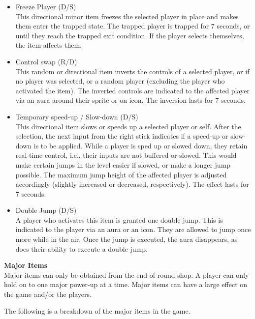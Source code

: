 \begin{itemize}
    \item Freeze Player (D/S)\\
This directional minor item freezes the selected player in place and makes them enter the trapped state. The trapped player is trapped for 7 seconds, or until they reach the trapped exit condition. If the player selects themselves, the item affects them.
    \item Control swap (R/D)\\
This random or directional item inverts the controls of a selected player, or if no player was selected, or a random player (excluding the player who activated the item). The inverted controls are indicated to the affected player via an aura around their sprite or on icon. The inversion lasts for 7 seconds.
    \item Temporary speed-up / Slow-down (D/S)\\
This directional item slows or speeds up a selected player or self. After the selection, the next input from the right stick indicates if a speed-up or slow-down is to be applied. While a player is sped up or slowed down, they retain real-time control, i.e., their inputs are not buffered or slowed. This would make certain jumps in the level easier if slowed, or make a longer jump possible. The maximum jump height of the affected player is adjusted accordingly (slightly increased or decreased, respectively). The effect lasts for 7 seconds.
    \item Double Jump (D/S)\\
A player who activates this item is granted one double jump. This is indicated to the player via an aura or an icon. They are allowed to jump once more while in the air. Once the jump is executed, the aura disappears, as does their ability to execute a double jump.
\end{itemize}

\par
\textbf{Major Items}
\\
Major items can only be obtained from the end-of-round shop. A player can only hold on to one major power-up at a time. Major items can have a large effect on the game and/or the players.
\par
The following is a breakdown of the major items in the game.

